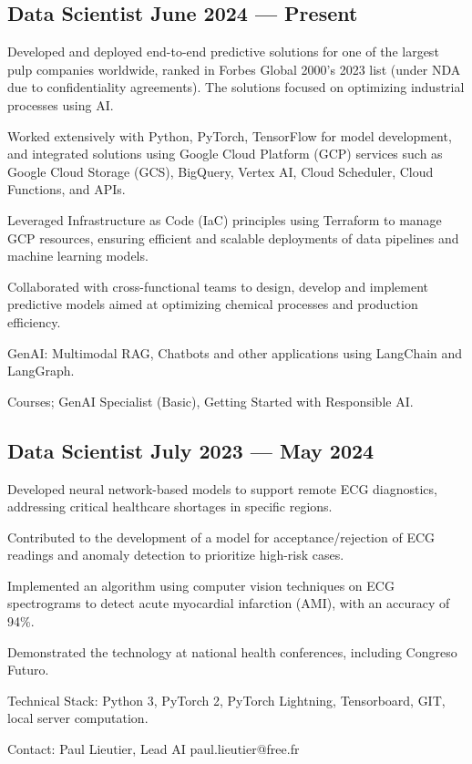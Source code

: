 
\subsection{{Data Scientist  \hfill June 2024 --- Present}}
\begin{zitemize}
\item Developed and deployed end-to-end predictive solutions for one of the largest pulp companies worldwide, ranked in Forbes Global 2000's 2023 list (under NDA due to confidentiality agreements). The solutions focused on optimizing industrial processes using AI.
\item Worked extensively with Python, PyTorch, TensorFlow for model development, and integrated solutions using Google Cloud Platform (GCP) services such as Google Cloud Storage (GCS), BigQuery, Vertex AI, Cloud Scheduler, Cloud Functions, and APIs.
\item Leveraged Infrastructure as Code (IaC) principles using Terraform to manage GCP resources, ensuring efficient and scalable deployments of data pipelines and machine learning models.
\item Collaborated with cross-functional teams to design, develop and implement predictive models aimed at optimizing chemical processes and production efficiency.
\item GenAI: Multimodal RAG, Chatbots and other applications using LangChain and LangGraph.
\item Courses; GenAI Specialist (Basic), Getting Started with Responsible AI.
\end{zitemize}

\subsection{{Data Scientist  \hfill July 2023 --- May 2024}}
\begin{zitemize}
\item Developed neural network-based models to support remote ECG diagnostics, addressing critical healthcare shortages in specific regions.
\item Contributed to the development of a model for acceptance/rejection of ECG readings and anomaly detection to prioritize high-risk cases.
\item Implemented an algorithm using computer vision techniques on ECG spectrograms to detect acute myocardial infarction (AMI), with an accuracy of 94\%. 
\item Demonstrated the technology at national health conferences, including Congreso Futuro.
\item Technical Stack: Python 3, PyTorch 2, PyTorch Lightning, Tensorboard, GIT, local server computation.
\item Contact: Paul Lieutier, Lead AI \hfill paul.lieutier@free.fr
\end{zitemize}


